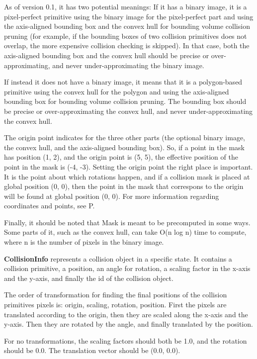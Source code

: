 As of version 0.1, it has two potential meanings:
If it has a binary image, it is a pixel-perfect primitive
using the binary image for the pixel-perfect part and
using the axis-aligned bounding box and the convex hull
for bounding volume collision pruning
(for example, if the bounding boxes of two collision primitives does not
overlap, the more expensive collision checking is skipped).
In that case,
both the axis-aligned bounding box and the convex hull
should be precise or over-approximating,
and never under-approximating the binary image.

If instead it does not have a binary image,
it means that it is a polygon-based primitive
using the convex hull for the polygon
and using the axis-aligned bounding box for
bounding volume collision pruning.
The bounding box should be precise or over-approximating
the convex hull, and never under-approximating the
convex hull.

The origin point indicates for the three other parts
(the optional binary image, the convex hull,
and the axis-aligned bounding box).
So, if a point in the mask has position (1, 2),
and the origin point is (5, 5), the effective
position of the point in the mask is (-4, -3).
Setting the origin point the right place is important.
It is the point about which rotations happen, and if
a collision mask is placed at global position (0, 0),
then the point in the mask that correspons to the
origin will be found at global position (0, 0).
For more information regarding coordinates and points,
see P.

Finally, it should be noted that Mask is meant
to be precomputed in some ways. Some parts of it,
such as the convex hull, can take O(n log n) time
to compute,
where n is the number of pixels in the binary image.

\textbf{CollisionInfo} represents a collision object
in a specific state.
It contains a collision primitive,
a position, an angle for rotation, a scaling factor
in the x-axis and the y-axis, and finally the id
of the collision object.

The order of transformation for finding the final positions
of the collision primitives pixels is: origin, scaling, rotation, position.
First the pixels are translated according to the origin,
then they are scaled along the x-axis and the y-axis.
Then they are rotated by the angle, and finally
translated by the position.

For no transformations, the scaling factors should both be
1.0, and the rotation should be 0.0. The translation
vector should be (0.0, 0.0).

